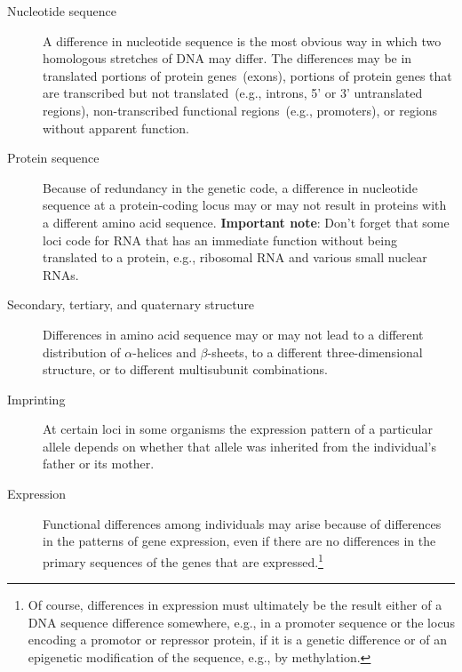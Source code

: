 \begin{description}

\item[Nucleotide sequence] A difference in nucleotide sequence is the
  most obvious way in which two homologous stretches of DNA may
  differ. The differences may be in translated portions of protein
  genes~(exons), portions of protein genes that are transcribed but
  not translated~(e.g., introns, 5' or 3' untranslated regions),
  non-transcribed functional regions~(e.g., promoters), or regions
  without apparent function.

\item[Protein sequence] Because of redundancy in the genetic code, a
  difference in nucleotide sequence at a protein-coding locus may or
  may not result in proteins with a different amino acid
  sequence. {\bf Important note}: Don't forget that some loci code for
  RNA that has an immediate function without being translated to a
  protein, e.g., ribosomal RNA and various small nuclear RNAs.

\item[Secondary, tertiary, and quaternary structure] Differences in
  amino acid sequence may or may not lead to a different distribution
  of $\alpha$-helices and $\beta$-sheets, to a different
  three-dimensional structure, or to different multisubunit
  combinations.

\item[Imprinting] At certain loci in some organisms the expression
  pattern of a particular allele depends on whether that allele was
  inherited from the individual's father or its
  mother.

\item[Expression] Functional differences among individuals may arise
  because of differences in the patterns of gene expression, even if
  there are no differences in the primary sequences of the genes that
  are expressed.\footnote{Of course, differences in expression must
    ultimately be the result either of a DNA sequence difference
    somewhere, e.g., in a promoter sequence or the locus encoding a
    promotor or repressor protein, if it is a genetic difference or of
    an epigenetic modification of the sequence, e.g., by methylation.}


\end{description}
